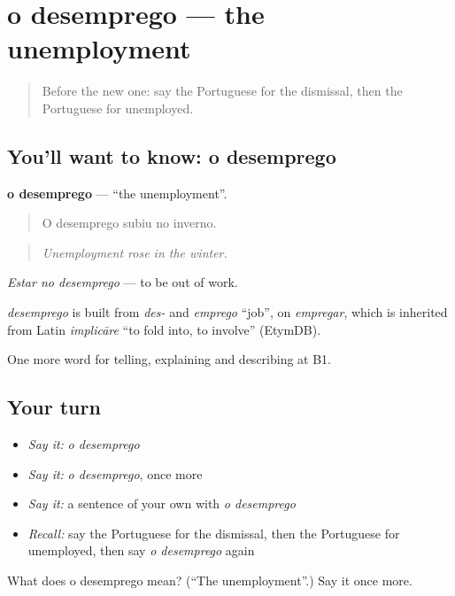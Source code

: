 \section[o desemprego]{o desemprego — the unemployment}

\label{lesson:PT-C356-desemprego}



\begin{quote}
Before the new one: say the Portuguese for the dismissal, then the Portuguese for unemployed.
\end{quote}

\subsection*{You'll want to know: o desemprego}
\textbf{o desemprego} — \textquotedblleft{}the unemployment\textquotedblright{}.

\begin{quote}
O desemprego subiu no inverno.
\end{quote}

\begin{quote}
\emph{Unemployment rose in the winter.}
\end{quote}

\emph{Estar no desemprego} — to be out of work.

\begin{cousinweb}
\emph{desemprego} is built from \emph{des-} and \emph{emprego} \textquotedblleft{}job\textquotedblright{}, on \emph{empregar}, which is inherited from Latin \emph{implicāre} \textquotedblleft{}to fold into, to involve\textquotedblright{} (EtymDB).
\end{cousinweb}

\begin{grammarlens}[title={What you've built}]
One more word for telling, explaining and describing at B1.
\end{grammarlens}

\subsection*{Your turn}
\begin{itemize}
\raggedright
  \item \emph{Say it:} \emph{o desemprego}
  \item \emph{Say it:} \emph{o desemprego}, once more
  \item \emph{Say it:} a sentence of your own with \emph{o desemprego}
  \item \emph{Recall:} say the Portuguese for the dismissal, then the Portuguese for unemployed, then say \emph{o desemprego} again
\end{itemize}

\begin{tcolorbox}[breakable,colback=teal!4,colframe=teal!35!black,title={Before you move on}]
What does o desemprego mean? (\textquotedblleft{}The unemployment\textquotedblright{}.) Say it once more.
\end{tcolorbox}
